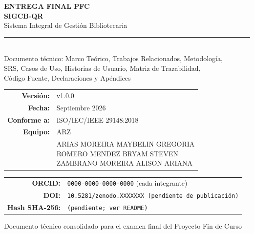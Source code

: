 \documentclass[
11pt,
a4paper,
]{report}
\author{}
\date{}
\begin{document}
	
	\begin{titlepage}
		\centering
		\vspace*{1.5cm}
		
		{\Large\bfseries\color{primaryblue} ENTREGA FINAL PFC}\\[0.6cm]
		
		{\huge\bfseries\color{primaryblue} SIGCB-QR}\\[0.3cm]
		{\Large\color{accentblue} Sistema Integral de Gestión Bibliotecaria}\\[1.5cm]
		
		\rule{0.55\textwidth}{0.6pt}\\[0.5cm]
		
		{\large Documento técnico: Marco Teórico, Trabajos Relacionados, Metodología,\\
			SRS, Casos de Uso, Historias de Usuario, Matriz de Trazabilidad,\\
			Código Fuente, Declaraciones y Apéndices}\\[2cm]
		
		\begin{tabular}{rl}
			\textbf{Versión:} & v1.0.0 \\[6pt]
			\textbf{Fecha:} & Septiembre 2026 \\[6pt]
			\textbf{Conforme a:} & ISO/IEC/IEEE 29148:2018 \\[6pt]
			\textbf{Equipo:} & ARZ \\
			\textbf{ } & \shortstack[l]{ARIAS MOREIRA MAYBELIN GREGORIA \\ ROMERO MENDEZ BRYAM STEVEN \\ ZAMBRANO MOREIRA ALISON ARIANA} \\
		\end{tabular}
		
		\vspace{1cm}
		
		\begin{tabular}{rl}
			\textbf{ORCID:} & \texttt{0000-0000-0000-0000} (cada integrante) \\[4pt]
			\textbf{DOI:} & \texttt{10.5281/zenodo.XXXXXXX (pendiente de publicación)} \\[4pt]
			\textbf{Hash SHA-256:} & \texttt{(pendiente; ver README)}
		\end{tabular}
		
		\vfill
		
		{\small\color{gray} Documento técnico consolidado para el examen final del Proyecto Fin de Curso}
		
	\end{titlepage}
	
\end{document}
